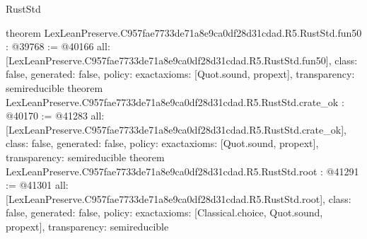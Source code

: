 \begin{lexlean}{RustStd}
\begin{coremodule}
{}
theorem LexLeanPreserve.C957fae7733de71a8e9ca0df28d31cdad.R5.RustStd.fun50 : @39768 := @40166 {
  all: [LexLeanPreserve.C957fae7733de71a8e9ca0df28d31cdad.R5.RustStd.fun50],
  class: false,
  generated: false,
  policy: exact{axioms: [Quot.sound, propext]},
  transparency: semireducible
}
theorem LexLeanPreserve.C957fae7733de71a8e9ca0df28d31cdad.R5.RustStd.crate_ok : @40170 := @41283 {
  all: [LexLeanPreserve.C957fae7733de71a8e9ca0df28d31cdad.R5.RustStd.crate_ok],
  class: false,
  generated: false,
  policy: exact{axioms: [Quot.sound, propext]},
  transparency: semireducible
}
theorem LexLeanPreserve.C957fae7733de71a8e9ca0df28d31cdad.R5.RustStd.root : @41291 := @41301 {
  all: [LexLeanPreserve.C957fae7733de71a8e9ca0df28d31cdad.R5.RustStd.root],
  class: false,
  generated: false,
  policy: exact{axioms: [Classical.choice, Quot.sound, propext]},
  transparency: semireducible
}


\end{coremodule}
\end{lexlean}
